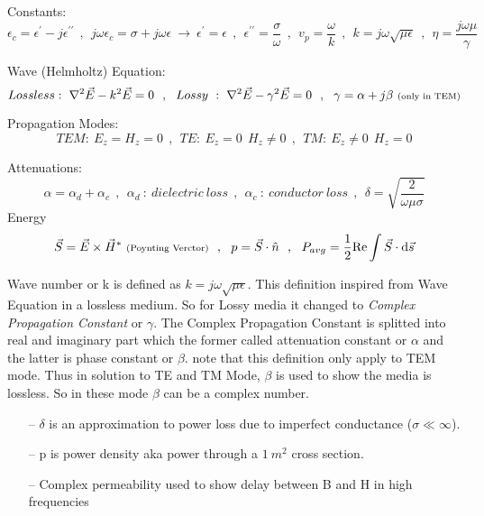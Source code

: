 Constants:
$$ {\epsilon}_c = {\epsilon}^{\prime} - j {\epsilon}^{\prime\prime}  ~~ , ~~ j \omega {\epsilon}_c = \sigma + j \omega \epsilon ~ \rightarrow ~  {\epsilon}^\prime = {\epsilon} ~~ , ~~ {\epsilon}^{\prime\prime} = \frac{\sigma}{\omega}  ~~ , ~~ v_p = \frac{\omega}{k} ~~ , ~~ k = j \omega \sqrt{\mu \epsilon} ~~ , ~~  \eta = \frac{j \omega \mu}{\gamma} $$
\par
Wave (Helmholtz) Equation:
$$Lossless:~ \nabla^2 \vec{E} - k^2 \vec{E} = 0 ~~ , ~~ Lossy ~ : ~ \nabla^2 \vec{E} - {\gamma}^2 \vec{E} = 0 ~~ , ~~ \gamma = \alpha + j\beta~ \text{\scriptsize(only~in~TEM)}  $$
\par
Propagation Modes: 
$$TEM:~ E_z = H_z = 0 ~~ , ~~ TE:~ E_z = 0 ~~ H_z \neq 0 ~~ , ~~ TM:~ E_z \neq 0 ~~ H_z = 0 $$
\par
Attenuations: 
$$ \alpha = {\alpha}_d + {\alpha}_c ~~ , ~~ {\alpha}_d ~: ~ dielectric~loss ~~ , ~~ {\alpha}_c ~ : ~ conductor~loss  ~~ , ~~ \delta = \sqrt{\frac{2}{\omega \mu \sigma}} $$
Energy
$$ \vec{S} = \vec{E} \times  \vec{H}^*~\text{\scriptsize(Poynting~Verctor)} ~~ , ~~ p = \vec{S} \cdot \hat{n} ~~ , ~~ P_{avg} = \frac{1}{2} \text{Re} \int{ \vec{S} \cdot \mathrm{d}\vec{s}}$$
\setlength{\parindent}{0.5cm} %
\vspace{-10pt}\par
Wave number or k is defined as $ k = j \omega \sqrt{\mu \epsilon} $. This definition inspired from Wave Equation in a lossless medium. So for Lossy media it changed to {\it Complex Propagation Constant} or $\gamma$.  The Complex Propagation Constant is splitted into real and imaginary part which the former called attenuation constant or $\alpha$ and the latter is phase constant or $\beta$. note that this definition only apply to TEM mode. Thus in solution to TE and TM Mode, $\beta$ is used to show the media is lossless. So in these mode $\beta$ can be a complex number.
\setlength{\parindent}{0.0cm}
\par\noindent
\begin{itemize}
\item[--] $\delta$ is an approximation to power loss due to imperfect conductance ($\sigma\ll\infty$).
\item[--] p is power density aka power through a $1~m^2$ cross section.
\item[--] Complex permeability used to show delay between B and H in high frequencies
\end{itemize}
\par
\setlength{\parindent}{0.0cm} %
